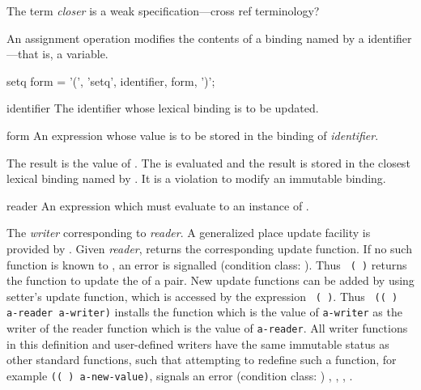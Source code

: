 %
\begin{optPrivate}
    The term {\em closer} is a weak specification---cross ref terminology?
\end{optPrivate}
%
\begin{optDefinition}
\noindent
An assignment operation modifies the contents of a
binding named by a identifier---that is, a variable.

%
\Syntax
\savesyntax\setqSyntax\vbox{\syntax
setq form
   = '(', 'setq', identifier, form, ')';
\endsyntax}
%
\begin{arguments}
    \item[identifier] The identifier whose lexical binding is to be updated.

    \item[form] An expression whose value is to be stored in the binding of {\em
        identifier}.
\end{arguments}
%
\result%
The result is the value of \form.
%
\remarks%
The \form{} is evaluated and the result is stored in the closest lexical
binding named by \identifier.  It is a violation to modify an immutable
binding.

%
\begin{arguments}
    \item[reader] An expression which must evaluate to an instance of
    .
\end{arguments}
%
\result%
The {\em writer\/} corresponding to {\em reader}.
%
\remarks%
A generalized place update facility is provided by .  Given
{\em reader},  returns the
corresponding update function.  If no such
function is known to , an error is signalled (condition
class: ).  Thus {\tt
    ( )} returns the function to update the
 of a pair.  New update functions can be added by using
{setter}'s update function, which is accessed by the expression {\tt
    ( )}.  Thus {\tt
    (( ) a-reader a-writer)} installs
the function which is the value of {\tt a-writer} as the writer of the reader
function which is the value of {\tt a-reader}.  All writer functions in this
definition and user-defined writers have the same immutable status as other
standard functions, such that attempting to redefine such a function, for
example {\tt (( ) 
    a-new-value)}, signals an error (condition class:
)
%
\seealso%
, , ,
.


\end{optDefinition}

